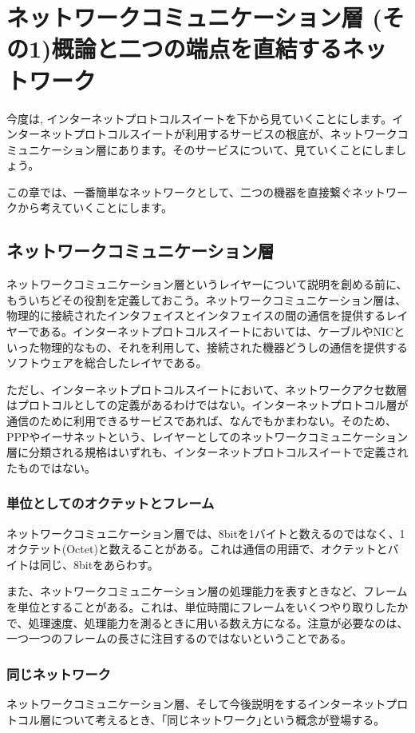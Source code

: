 \chapter{ネットワークコミュニケーション層 (その1)概論と二つの端点を直結するネットワーク}

今度は,
インターネットプロトコルスイートを下から見ていくことにします。インターネットプロトコルスイートが利用するサービスの根底が、ネットワークコミュニケーション層にあります。そのサービスについて、見ていくことにしましょう。

この章では、一番簡単なネットワークとして、二つの機器を直接繋ぐネットワークから考えていくことにします。


\section{ネットワークコミュニケーション層}
ネットワークコミュニケーション層というレイヤーについて説明を創める前に、もういちどその役割を定義しておこう。ネットワークコミュニケーション層は、物理的に接続されたインタフェイスとインタフェイスの間の通信を提供するレイヤーである。インターネットプロトコルスイートにおいては、ケーブルやNICといった物理的なもの、それを利用して、接続された機器どうしの通信を提供するソフトウェアを総合したレイヤである。

ただし、インターネットプロトコルスイートにおいて、ネットワークアクセ数層はプロトコルとしての定義があるわけではない。インターネットプロトコル層が通信のために利用できるサービスであれば、なんでもかまわない。そのため、PPPやイーサネットという、レイヤーとしてのネットワークコミュニケーション層に分類される規格はいずれも、インターネットプロトコルスイートで定義されたものではない。

\subsection{単位としてのオクテットとフレーム}
ネットワークコミュニケーション層では、8bitを1バイトと数えるのではなく、1オクテット(Octet)と数えることがある。これは通信の用語で、オクテットとバイトは同じ、8bitをあらわす。

また、ネットワークコミュニケーション層の処理能力を表すときなど、フレームを単位とすることがある。これは、単位時間にフレームをいくつやり取りしたかで、処理速度、処理能力を測るときに用いる数え方になる。注意が必要なのは、一つ一つのフレームの長さに注目するのではないということである。

\subsection{同じネットワーク}
ネットワークコミュニケーション層、そして今後説明をするインターネットプロトコル層について考えるとき、｢同じネットワーク｣という概念が登場する。

